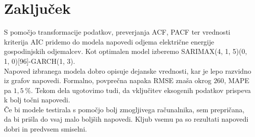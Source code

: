 \documentclass[a4paper, 11pt]{article}
\begin{document}

\section{Zaključek}

\noindent S pomočjo transformacije podatkov, preverjanja ACF, PACF ter vrednosti kriterija AIC pridemo do 
modela napovedi odjema električne energije gospodinjskih odjemalcev. 
Kot optimalen model izberemo SARIMAX(4, 1, 5)(0, 1, 0)[96]-GARCH(1, 3). \\

\noindent Napoved izbranega modela dobro opisuje dejanske vrednosti, kar je lepo razvidno iz grafov napovedi. 
Formalno, povprečna napaka RMSE znaša okrog $260$, 
MAPE pa $1{,}5~\%$. Tekom dela ugotovimo tudi, da vključitev eksogenih podatkov prispeva k bolj točni napovedi. \\

\noindent Če bi modele testirala s pomočjo bolj zmogljivega računalnika, sem prepričana, da bi prišla do vsaj malo boljših
napovedi. Kljub vsemu pa so rezultati napovedi dobri in predvsem smiselni.






\end{document}
